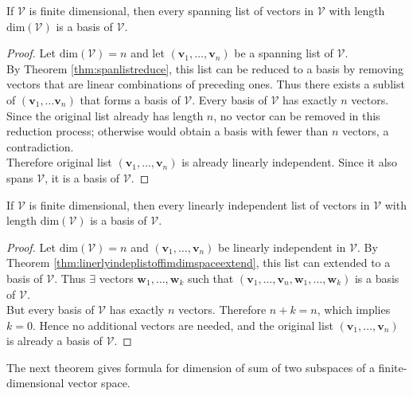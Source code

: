 \begin{proposition} \label{prop:fimdimspanlistisabasis} If $\mathcal{V}$ is finite dimensional, then every spanning list of vectors in $\mathcal{V}$ with length $\text{dim}(\mathcal{V})$ is a basis of $\mathcal{V}$.
\begin{proof} Let $\text{dim}(\mathcal{V}) = n$ and let $(\mathbf{v}_1, \ldots, \mathbf{v}_n)$ be a spanning list of $\mathcal{V}$.\\
By Theorem \ref{thm:spanlistreduce}, this list can be reduced to a basis by removing vectors that are linear combinations of preceding ones. Thus there exists a sublist of $(\mathbf{v}_1, \ldots \mathbf{v}_n)$ that forms a basis of $\mathcal{V}$. Every basis of $\mathcal{V}$ has exactly $n$ vectors. Since the original list already has length $n$, no vector can be removed in this reduction process; otherwise would obtain a basis with fewer than $n$ vectors, a contradiction.\\
Therefore original list $(\mathbf{v}_1, \ldots, \mathbf{v}_n)$ is already linearly independent. Since it also spans $\mathcal{V}$, it is a basis of $\mathcal{V}$.
\end{proof}
\end{proposition}

\begin{proposition} \label{prop:linindeplistlengisbasis} If $\mathcal{V}$ is finite dimensional, then every linearly independent list of vectors in $\mathcal{V}$ with length $\text{dim}(\mathcal{V})$ is a basis of $\mathcal{V}$.
\begin{proof} Let $\text{dim}(\mathcal{V}) = n$ and $(\mathbf{v}_1, \ldots, \mathbf{v}_n)$ be linearly independent in $\mathcal{V}$. By Theorem \ref{thm:linerlyindeplistoffimdimspaceextend}, this list can extended to a basis of $\mathcal{V}$. Thus $\exists$ vectors $\mathbf{w}_1, \ldots, \mathbf{w}_k$ such that $(\mathbf{v}_1, \ldots, \mathbf{v}_n, \mathbf{w}_1, \ldots, \mathbf{w}_k)$ is a basis of $\mathcal{V}$.\\
But every basis of $\mathcal{V}$ has exactly $n$ vectors. Therefore $n + k = n$, which implies $k=0$. Hence no additional vectors are needed, and the original list $(\mathbf{v}_1, \ldots, \mathbf{v}_n)$ is already a basis of $\mathcal{V}$.
\end{proof}
\end{proposition}

The next theorem gives formula for dimension of sum of two subspaces of a finite-dimensional vector space.

